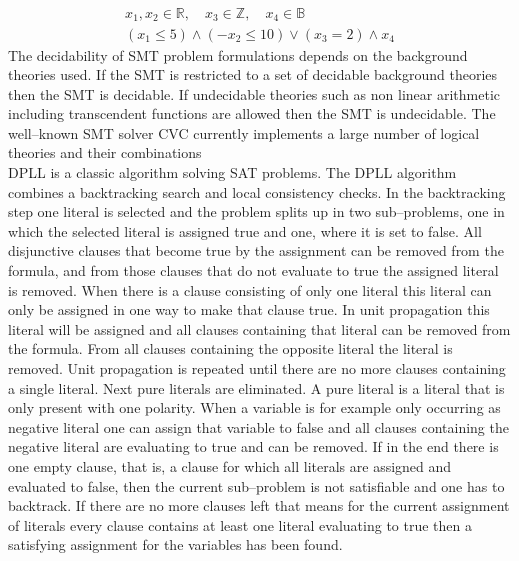 \begin{eqnarray}
\label{eqn:SMTExample}
x_1,x_2\in \mathbb{R}, \quad x_3 \in \mathbb{Z},\quad x_4\in \mathbb{B}\\
\label{eqn:SMTExampleEnd}
(x_1\leq 5) \land (-x_2\leq 10) \lor (x_3=2) \land x_4
\end{eqnarray}
The decidability of SMT problem formulations depends on the background theories used. If the SMT is restricted to a set of decidable background theories then the SMT is decidable. If undecidable theories such as non linear arithmetic including transcendent functions are allowed then the SMT is undecidable. The well--known SMT solver CVC currently implements a large number of logical theories and their combinations \cite{cvc}\\
DPLL \cite{DPLL} is a classic algorithm solving SAT problems. The DPLL algorithm combines a backtracking search and local consistency checks. In the backtracking step one literal is selected and the problem splits up in two sub--problems, one in which the selected literal is assigned true and one, where it is set to false. All disjunctive clauses that become true by the assignment can be removed from the formula, and from those clauses that do not evaluate to true the assigned literal is removed. When there is a clause consisting of only one literal this literal can only be assigned in one way to make that clause true. In unit propagation this literal will be assigned and all clauses containing that literal can be removed from the formula. From all clauses containing the opposite literal the literal is removed. Unit propagation is repeated until there are no more clauses containing a single literal. Next pure literals are eliminated. A pure literal is a literal that is only present with one polarity. When a variable is for example only occurring as negative literal one can assign that variable to false and all clauses containing the negative literal are evaluating to true and can be removed. If in the end there is one empty clause, that is, a clause for which all literals are assigned and evaluated to false, then the current sub--problem is not satisfiable and one has to backtrack. If there are no more clauses left that means for the current assignment of literals every clause contains at least one literal evaluating to true then a satisfying assignment for the variables has been found.
